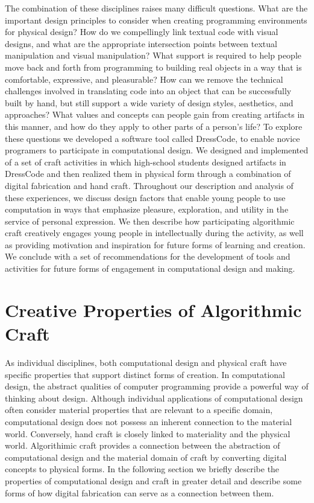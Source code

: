 \documentclass{sigchi}
\begin{document}
The combination of these disciplines raises many difficult questions. What are the important design principles to consider when creating programming environments for physical design? How do we compellingly link textual code with visual designs, and what are the appropriate intersection points between textual manipulation and visual manipulation? What support is required to help people move back and forth from programming to building real objects in a way that is comfortable, expressive, and pleasurable? How can we remove the technical challenges involved in translating code into an object that can be successfully built by hand, but still support a wide variety of design styles, aesthetics, and approaches? What values and concepts can people gain from creating artifacts in this manner, and how do they apply to other parts of a person's life? To explore these questions we developed a software tool called DressCode, to enable novice programers to participate in computational design. We designed and implemented of a set of craft activities in which high-school students designed artifacts in DressCode and then realized them in physical form through a combination of digital fabrication and hand craft. Throughout our description and analysis of these experiences, we discuss design factors that enable young people to use computation in ways that emphasize pleasure, exploration, and utility in the service of personal expression. We then describe how participating algorithmic craft creatively engages young people in intellectually during the activity, as well as providing motivation and inspiration for future forms of learning and creation. We conclude with a set of recommendations for the development of tools and activities for future forms of engagement in computational design and making.

\section{Creative Properties of Algorithmic Craft}
As individual disciplines, both computational design and physical craft have specific properties that support distinct forms of creation. In computational design, the abstract qualities of computer programming provide a powerful way of thinking about design. Although individual applications of computational design often consider material properties that are relevant to a specific domain, computational design does not possess an inherent connection to the material world. Conversely, hand craft is closely linked to materiality and the physical world. Algorithimic craft provides a connection between the abstraction of computational design and the material domain of craft by converting digital concepts to physical forms. In the following section we briefly describe the properties of computational design and craft in greater detail and describe some forms of how digital fabrication can serve as a connection between them.
\end{document}
